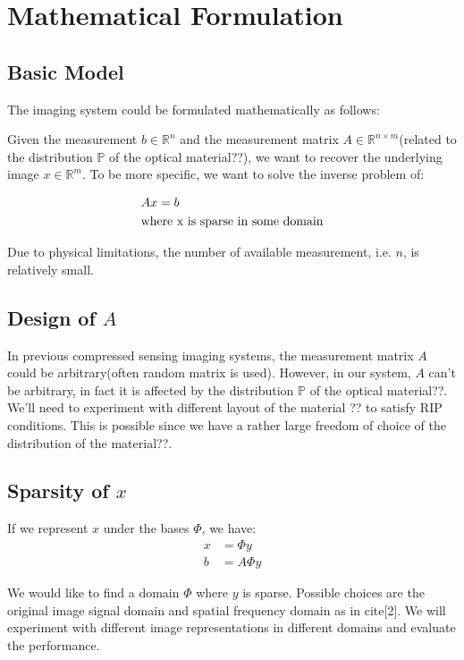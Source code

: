 \documentclass{article} %
\begin{document}
\section{Mathematical Formulation}

\subsection{Basic Model}
The imaging system could be formulated mathematically as follows:

Given the measurement $b \in \mathbb{R}^n$ and the measurement matrix $A \in \mathbb{R}^{n \times m}$(related to the distribution $\mathbb{P}$ of the optical material??), we want to recover the underlying image $x \in \mathbb{R}^m$.  To be more specific, we want to solve the inverse problem of:

\begin{align}
&Ax=b\\ \notag
&\text{where x is sparse in some domain} 
\end{align}

Due to physical limitations, the number of available measurement, i.e. $n$, is relatively small. 

\subsection{Design of $A$}
In previous compressed sensing imaging systems, the measurement matrix $A$ could be arbitrary(often random matrix is used). However, in our system, $A$ can't be arbitrary, in fact it is affected by the distribution $\mathbb{P}$ of the optical material??. We'll need to experiment with different layout of the material ?? to satisfy RIP conditions. This is possible since we have a rather large freedom of choice of the distribution of the material??.

\subsection{Sparsity of $x$}
If we represent $x$ under the bases $\Phi$, we have:
\begin{align}
x & =\Phi y \\
b & = A \Phi y 
\end{align}

We  would like to find a domain $\Phi$ where $y$ is sparse. Possible choices are the original image signal domain and spatial frequency domain as in cite[2]. We will experiment with different image representations in different domains and evaluate the performance.
\end{document}
